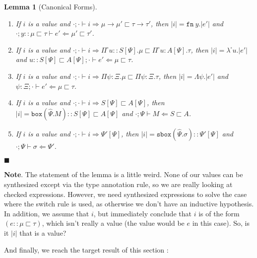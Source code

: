 \documentclass[letterpaper, 11pt]{article}
\newtheorem*{lemma}[subsection]{Lemma}
\newenvironment*{proof}{\par\noindent{\normalfont{\bf{Proof. \\ \hphantom{mm}
}}}}{\hfill \small$\blacksquare$\\[-4pt]}
\newcommand{\Rar}{\Rightarrow}
\newcommand{\Lar}{\Leftarrow}
\newcommand{\rar}{\rightarrow}
\newcommand{\fn}{\texttt{fn}}
\newcommand{\bbox}{\texttt{box}}
\newcommand{\sbbox}{\texttt{sbox}}
\begin{document}
    \begin{lemma}[Canonical Forms]
      \leavevmode
      \begin{enumerate}
        \item If $i$ is a value and $\cdot ; \cdot \vdash i \Rar \mu \rar \mu' \sqsubset \tau \rar \tau'$, then $|i| = \fn \ y.|e'|$ and
          $\cdot; y{::}\mu \sqsubset \tau \vdash e' \Lar \mu' \sqsubset \tau'$.

        \item If $i$ is a value and $\cdot; \cdot \vdash i \Rar \Pi^\square u {::} S[\Psi]. \mu \sqsubset \Pi^\square u{:}A[\Psi]. \tau$, then 
          $|i| = \lambda^\square u. |e'|$ and $u{::}S[\Psi] \sqsubset A[\Psi] ; \cdot \vdash e' \Lar \mu \sqsubset \tau$.

        \item If $i$ is a value and $\cdot ; \cdot \vdash i \Rar \Pi \psi{:}\Xi. \mu \sqsubset \Pi \psi{:}\Xi. \tau$, then $|i| = \Lambda \psi. |e'|$ and
          $\psi{:}\Xi ; \cdot \vdash e' \Lar \mu \sqsubset \tau$.

        \item If $i$ is a value and $\cdot ; \cdot \vdash i \Rar S[\Psi] \sqsubset A[\Psi]$, then $|i| = \bbox(\hat{\Psi}. M) :: S[\Psi] \sqsubset A[\Psi]$ 
          and $\cdot ; \Psi \vdash M \Lar S \sqsubset A$.

        \item If $i$ is a value and $\cdot ; \cdot \vdash i \Rar \Psi'[\Psi]$, then $|i| = \sbbox(\hat{\Psi}. \sigma) :: \Psi'[\Psi]$ and 
          $\cdot; \Psi \vdash \sigma \Lar \Psi'$.
      \end{enumerate}

      \begin{proof}
        
      \end{proof}
    \end{lemma}

    \textbf{Note}.  The statement of the lemma is a little weird.  None of our values can be synthesized except via the type annotation rule, so we are 
    really looking at checked expressions.  However, we need synthesized expressions to solve the case where the switch rule is used, as otherwise we 
    don't have an inductive hypothesis.  In addition, we assume that $i$, but immediately conclude that $i$ is of the form $(e :: \mu \sqsubset \tau)$, 
    which isn't really a value (the value would be $e$ in this case).  So, is it $|i|$ that is a value?

    And finally, we reach the target result of this section :
\end{document}
